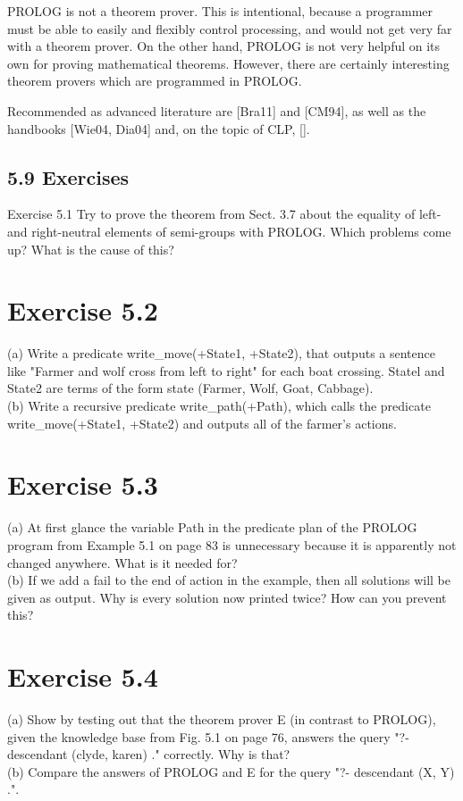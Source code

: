\documentclass[10pt]{article}
\begin{document}
PROLOG is not a theorem prover. This is intentional, because a programmer must be able to easily and flexibly control processing, and would not get very far with a theorem prover. On the other hand, PROLOG is not very helpful on its own for proving mathematical theorems. However, there are certainly interesting theorem provers which are programmed in PROLOG.

Recommended as advanced literature are [Bra11] and [CM94], as well as the handbooks [Wie04, Dia04] and, on the topic of CLP, [\cite{bartak1998online}].

\subsection*{5.9 Exercises}
Exercise 5.1 Try to prove the theorem from Sect. 3.7 about the equality of left- and right-neutral elements of semi-groups with PROLOG. Which problems come up? What is the cause of this?

\section*{Exercise 5.2}
(a) Write a predicate write\_move(+State1, +State2), that outputs a sentence like "Farmer and wolf cross from left to right" for each boat crossing. Statel and State2 are terms of the form state (Farmer, Wolf, Goat, Cabbage).\\
(b) Write a recursive predicate write\_path(+Path), which calls the predicate write\_move(+State1, +State2) and outputs all of the farmer's actions.

\section*{Exercise 5.3}
(a) At first glance the variable Path in the predicate plan of the PROLOG program from Example 5.1 on page 83 is unnecessary because it is apparently not changed anywhere. What is it needed for?\\
(b) If we add a fail to the end of action in the example, then all solutions will be given as output. Why is every solution now printed twice? How can you prevent this?

\section*{Exercise 5.4}
(a) Show by testing out that the theorem prover E (in contrast to PROLOG), given the knowledge base from Fig. 5.1 on page 76, answers the query "?- descendant (clyde, karen) ." correctly. Why is that?\\
(b) Compare the answers of PROLOG and E for the query "?- descendant (X, Y) .".
\end{document}
